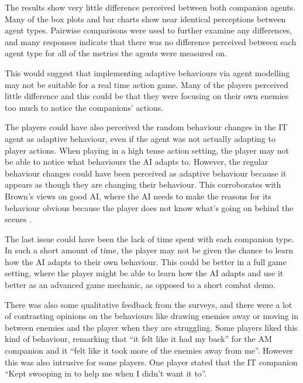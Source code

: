 \documentclass{IEEEtran}
\begin{document}
The results show very little difference perceived between both companion agents. Many of the box plots and bar charts show near identical perceptions between agent types. Pairwise comparisons were used to further examine any differences, and many responses indicate that there was no difference perceived between each agent type for all of the metrics the agents were measured on.

This would suggest that implementing adaptive behaviours via agent modelling may not be suitable for a real time action game. Many of the players perceived little difference and this could be that they were focusing on their own enemies too much to notice the companions’ actions.

The players could have also perceived the random behaviour changes in the IT agent as adaptive behaviour, even if the agent was not actually adapting to player actions. When playing in a high tense action setting, the player may not be able to notice what behaviours the AI adapts to. However, the regular behaviour changes could have been perceived as adaptive behaviour because it appears as though they are changing their behaviour. This corroborates with Brown’s views on good AI, where the AI needs to make the reasons for its behaviour obvious because the player does not know what’s going on behind the scenes \cite{GMTGoodAI}.

The last issue could have been the lack of time spent with each companion type. In such a short amount of time, the player may not be given the chance to learn how the AI adapts to their own behaviour. This could be better in a full game setting, where the player might be able to learn how the AI adapts and use it better as an advanced game mechanic, as opposed to a short combat demo.


There was also some qualitative feedback from the surveys, and there were a lot of contrasting opinions on the behaviours like drawing enemies away or moving in between enemies and the player when they are struggling. Some players liked this kind of behaviour, remarking that “it felt like it had my back” for the AM companion and it “felt like it took more of the enemies away from me”. However this was also intrusive for some players. One player stated that the IT companion “Kept swooping in to help me when I didn’t want it to”. 
\end{document}
